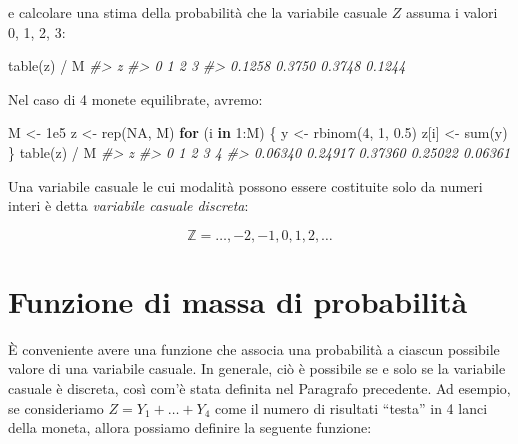 \documentclass[
  11pt,
]{krantz}
\makeatletter
\newenvironment{Shaded}{\begin{snugshade}}{\end{snugshade}}
\newcommand{\CommentTok}[1]{\textcolor[rgb]{0.37,0.37,0.37}{\textit{#1}}}
\newcommand{\ConstantTok}[1]{\textcolor[rgb]{0,0,0}{#1}}
\newcommand{\ControlFlowTok}[1]{\textcolor[rgb]{0.27,0.27,0.27}{\textbf{#1}}}
\newcommand{\DecValTok}[1]{\textcolor[rgb]{0.06,0.06,0.06}{#1}}
\newcommand{\FloatTok}[1]{\textcolor[rgb]{0.06,0.06,0.06}{#1}}
\newcommand{\FunctionTok}[1]{\textcolor[rgb]{0,0,0}{#1}}
\newcommand{\NormalTok}[1]{#1}
\newcommand{\OtherTok}[1]{\textcolor[rgb]{0.37,0.37,0.37}{#1}}
\newcommand{\SpecialCharTok}[1]{\textcolor[rgb]{0,0,0}{#1}}
\newenvironment{kframe}{%
\medskip{}
\setlength{\fboxsep}{.8em}
 \def\at@end@of@kframe{}%
 \ifinner\ifhmode%
  \def\at@end@of@kframe{\end{minipage}}%
  \begin{minipage}{\columnwidth}%
 \fi\fi%
 \def\FrameCommand##1{\hskip\@totalleftmargin \hskip-\fboxsep
 \colorbox{shadecolor}{##1}\hskip-\fboxsep
     \hskip-\linewidth \hskip-\@totalleftmargin \hskip\columnwidth}%
 \MakeFramed {\advance\hsize-\width
   \@totalleftmargin\z@ \linewidth\hsize
   \@setminipage}}%
 {\par\unskip\endMakeFramed%
 \at@end@of@kframe}
\renewenvironment{Shaded}{\begin{kframe}}{\end{kframe}}
\theoremstyle{definition}
\theoremstyle{definition}
\theoremstyle{definition}
\theoremstyle{definition}
\theoremstyle{remark}
\makeatother
\begin{document}
e calcolare una stima della probabilità che la variabile casuale \(Z\) assuma i valori 0, 1, 2, 3:

\begin{Shaded}
\begin{Highlighting}[]
\FunctionTok{table}\NormalTok{(z) }\SpecialCharTok{/}\NormalTok{ M}
\CommentTok{\#\textgreater{} z}
\CommentTok{\#\textgreater{}      0      1      2      3 }
\CommentTok{\#\textgreater{} 0.1258 0.3750 0.3748 0.1244}
\end{Highlighting}
\end{Shaded}

Nel caso di 4 monete equilibrate, avremo:

\begin{Shaded}
\begin{Highlighting}[]
\NormalTok{M }\OtherTok{\textless{}{-}} \FloatTok{1e5}
\NormalTok{z }\OtherTok{\textless{}{-}} \FunctionTok{rep}\NormalTok{(}\ConstantTok{NA}\NormalTok{, M)}
\ControlFlowTok{for}\NormalTok{ (i }\ControlFlowTok{in} \DecValTok{1}\SpecialCharTok{:}\NormalTok{M) \{}
\NormalTok{  y }\OtherTok{\textless{}{-}} \FunctionTok{rbinom}\NormalTok{(}\DecValTok{4}\NormalTok{, }\DecValTok{1}\NormalTok{, }\FloatTok{0.5}\NormalTok{)}
\NormalTok{  z[i] }\OtherTok{\textless{}{-}} \FunctionTok{sum}\NormalTok{(y)}
\NormalTok{\}}
\FunctionTok{table}\NormalTok{(z) }\SpecialCharTok{/}\NormalTok{ M}
\CommentTok{\#\textgreater{} z}
\CommentTok{\#\textgreater{}       0       1       2       3       4 }
\CommentTok{\#\textgreater{} 0.06340 0.24917 0.37360 0.25022 0.06361}
\end{Highlighting}
\end{Shaded}

Una variabile casuale le cui modalità possono essere costituite solo da numeri interi è detta \emph{variabile casuale discreta}:

\[
\mathbb{Z} = \dots, -2, -1, 0, 1, 2, \dots
\]

\hypertarget{sec:fun-mass-prob}{%
\section{Funzione di massa di probabilità}\label{sec:fun-mass-prob}}

È conveniente avere una funzione che associa una probabilità a ciascun possibile valore di una variabile casuale. In generale, ciò è possibile se e solo se la variabile casuale è discreta, così com'è stata definita nel Paragrafo precedente. Ad esempio, se consideriamo \(Z = Y_1 + \dots + Y_4\) come il numero di risultati ``testa'' in 4 lanci della moneta, allora possiamo definire la seguente funzione:
\end{document}

